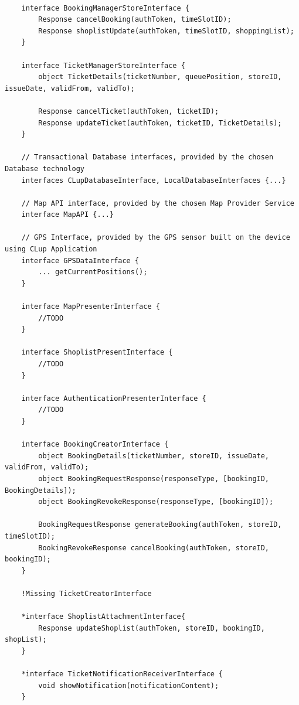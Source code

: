 \clearpage

\begin{lstlisting}

    interface BookingManagerStoreInterface {
        Response cancelBooking(authToken, timeSlotID);
        Response shoplistUpdate(authToken, timeSlotID, shoppingList);
    }

    interface TicketManagerStoreInterface {
        object TicketDetails(ticketNumber, queuePosition, storeID, issueDate, validFrom, validTo);

        Response cancelTicket(authToken, ticketID);
        Response updateTicket(authToken, ticketID, TicketDetails);
    }

    // Transactional Database interfaces, provided by the chosen Database technology
    interfaces CLupDatabaseInterface, LocalDatabaseInterfaces {...}

    // Map API interface, provided by the chosen Map Provider Service
    interface MapAPI {...}

    // GPS Interface, provided by the GPS sensor built on the device using CLup Application
    interface GPSDataInterface {
        ... getCurrentPositions();
    }
    
    interface MapPresenterInterface {
        //TODO
    }

    interface ShoplistPresentInterface {
        //TODO
    }

    interface AuthenticationPresenterInterface {
        //TODO
    }

    interface BookingCreatorInterface {
        object BookingDetails(ticketNumber, storeID, issueDate, validFrom, validTo);
        object BookingRequestResponse(responseType, [bookingID, BookingDetails]);
        object BookingRevokeResponse(responseType, [bookingID]);

        BookingRequestResponse generateBooking(authToken, storeID, timeSlotID);
        BookingRevokeResponse cancelBooking(authToken, storeID, bookingID);
    }

    !Missing TicketCreatorInterface

    *interface ShoplistAttachmentInterface{
        Response updateShoplist(authToken, storeID, bookingID, shopList);
    }

    *interface TicketNotificationReceiverInterface {
        void showNotification(notificationContent);
    }
    
\end{lstlisting}

\clearpage


